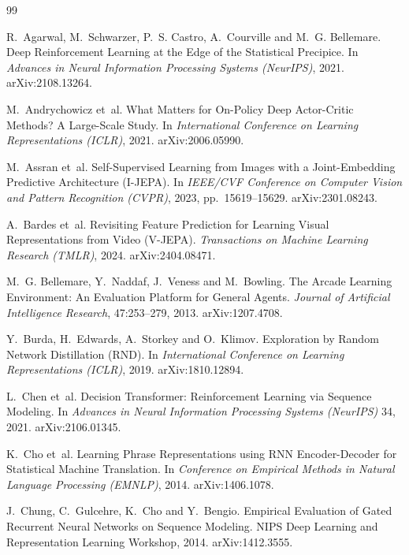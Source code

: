 \documentclass[11pt]{article}
\begin{document}
\begin{thebibliography}{99}
\small

R.~Agarwal, M.~Schwarzer, P.~S. Castro, A.~Courville and M.~G. Bellemare.
\newblock Deep Reinforcement Learning at the Edge of the Statistical Precipice.
\newblock In \emph{Advances in Neural Information Processing Systems (NeurIPS)}, 2021. arXiv:2108.13264.

M.~Andrychowicz et~al.
\newblock What Matters for On-Policy Deep Actor-Critic Methods? A Large-Scale Study.
\newblock In \emph{International Conference on Learning Representations (ICLR)}, 2021. arXiv:2006.05990.

M.~Assran et~al.
\newblock Self-Supervised Learning from Images with a Joint-Embedding Predictive Architecture (I-JEPA).
\newblock In \emph{IEEE/CVF Conference on Computer Vision and Pattern Recognition (CVPR)}, 2023, pp.~15619--15629. arXiv:2301.08243.

A.~Bardes et~al.
\newblock Revisiting Feature Prediction for Learning Visual Representations from Video (V-JEPA).
\newblock \emph{Transactions on Machine Learning Research (TMLR)}, 2024. arXiv:2404.08471.

M.~G. Bellemare, Y.~Naddaf, J.~Veness and M.~Bowling.
\newblock The Arcade Learning Environment: An Evaluation Platform for General Agents.
\newblock \emph{Journal of Artificial Intelligence Research}, 47:253--279, 2013. arXiv:1207.4708.

Y.~Burda, H.~Edwards, A.~Storkey and O.~Klimov.
\newblock Exploration by Random Network Distillation (RND).
\newblock In \emph{International Conference on Learning Representations (ICLR)}, 2019. arXiv:1810.12894.

L.~Chen et~al.
\newblock Decision Transformer: Reinforcement Learning via Sequence Modeling.
\newblock In \emph{Advances in Neural Information Processing Systems (NeurIPS)} 34, 2021. arXiv:2106.01345.

K.~Cho et~al.
\newblock Learning Phrase Representations using RNN Encoder-Decoder for Statistical Machine Translation.
\newblock In \emph{Conference on Empirical Methods in Natural Language Processing (EMNLP)}, 2014. arXiv:1406.1078.

J.~Chung, C.~Gulcehre, K.~Cho and Y.~Bengio.
\newblock Empirical Evaluation of Gated Recurrent Neural Networks on Sequence Modeling.
\newblock NIPS Deep Learning and Representation Learning Workshop, 2014. arXiv:1412.3555.


\end{thebibliography}
\end{document}
